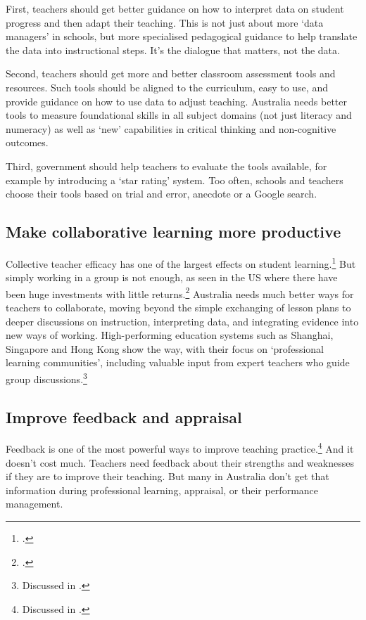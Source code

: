 First, teachers should get better guidance on how to interpret data on student progress and then adapt their teaching. This is not just about more `data managers' in schools, but more specialised pedagogical guidance to help translate the data into instructional steps. It’s the dialogue that matters, not the data.

Second, teachers should get more and better classroom assessment tools and resources. Such tools should be aligned to the curriculum, easy to use, and provide guidance on how to use data to adjust teaching. Australia needs better tools to measure foundational skills in all subject domains (not just literacy and numeracy) as well as `new' capabilities in critical thinking and non-cognitive outcomes.

Third, government should help teachers to evaluate the tools available, for example by introducing a `star rating' system. Too often, schools and teachers choose their tools based on trial and error, anecdote or a Google search.

\subsection{Make collaborative learning more productive}\label{subsec:collaborative-learning}

Collective teacher efficacy has one of the largest effects on student learning.\footcite{Hattie2015Whatworksbestineducation}
But simply working in a group is not enough, as seen in the US where there have been huge investments with little returns.\footcite{TNTP2015TheMirage}
Australia needs much better ways for teachers to collaborate, moving beyond the simple exchanging of lesson plans to deeper discussions on instruction, interpreting data, and integrating evidence into new ways of working. High-performing education systems such as Shanghai, Singapore and Hong Kong show the way, with their focus on `professional learning communities', including valuable input from expert teachers who guide group discussions.\footnote{Discussed in \textcite{Jensen2012CatchingUpLearning}.}   

\subsection{Improve feedback and appraisal}\label{subsec:feedback}

Feedback is one of the most powerful ways to improve teaching practice.\footnote{Discussed in \textcite{Jensen2011BetterTeacherAppraisal}.}   And it doesn't cost much. Teachers need feedback about their strengths and weaknesses if they are to improve their teaching. But many in Australia don’t get that information during professional learning, appraisal, or their performance management.

